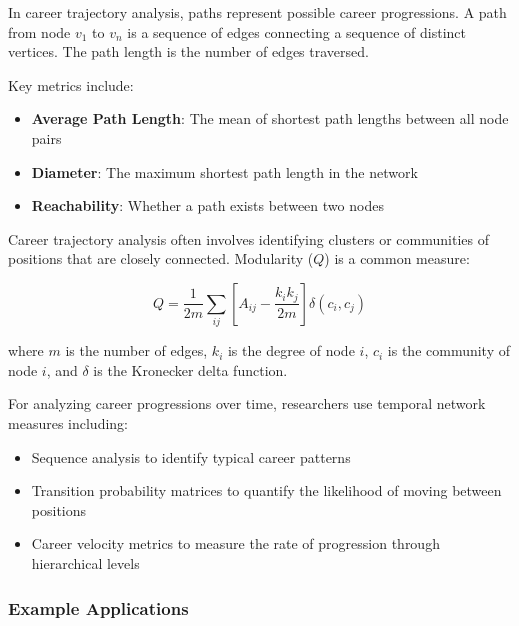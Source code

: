 \documentclass[../main.tex]{subfiles}
\begin{document}

In career trajectory analysis, paths represent possible career progressions. A path from node \(v_1\) to \(v_n\) is a sequence of edges connecting a sequence of distinct vertices. The path length is the number of edges traversed.

Key metrics include:
\begin{itemize}
\item \textbf{Average Path Length}: The mean of shortest path lengths between all node pairs
\item \textbf{Diameter}: The maximum shortest path length in the network
\item \textbf{Reachability}: Whether a path exists between two nodes
\end{itemize}


Career trajectory analysis often involves identifying clusters or communities of positions that are closely connected. Modularity (\(Q\)) is a common measure:

\[ Q = \frac{1}{2m} \sum_{ij} \left[ A_{ij} - \frac{k_i k_j}{2m} \right] \delta(c_i, c_j) \]

where \(m\) is the number of edges, \(k_i\) is the degree of node \(i\), \(c_i\) is the community of node \(i\), and \(\delta\) is the Kronecker delta function.


For analyzing career progressions over time, researchers use temporal network measures including:
\begin{itemize}
\item Sequence analysis to identify typical career patterns
\item Transition probability matrices to quantify the likelihood of moving between positions
\item Career velocity metrics to measure the rate of progression through hierarchical levels \citep{clochard_network_2022}
\end{itemize}

\subsubsection{Example Applications}
\end{document}
